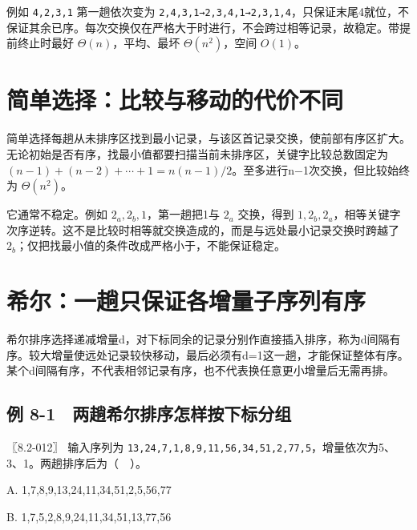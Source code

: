 例如 \texttt{4,}\allowbreak{}\texttt{2,}\allowbreak{}\texttt{3,}\allowbreak{}\texttt{1} 第一趟依次变为 \texttt{2,}\allowbreak{}\texttt{4,}\allowbreak{}\texttt{3,}\allowbreak{}\texttt{1→2,}\allowbreak{}\texttt{3,}\allowbreak{}\texttt{4,}\allowbreak{}\texttt{1→2,}\allowbreak{}\texttt{3,}\allowbreak{}\texttt{1,}\allowbreak{}\texttt{4}，只保证末尾4就位，不保证其余已序。每次交换仅在严格大于时进行，不会跨过相等记录，故稳定。带提前终止时最好 \(\Theta(n)\)，平均、最坏 \(\Theta(n^2)\)，空间 \(O(1)\)。

\section{简单选择：比较与移动的代价不同}\label{ds-08-04}

简单选择每趟从未排序区找到最小记录，与该区首记录交换，使前部有序区扩大。无论初始是否有序，找最小值都要扫描当前未排序区，关键字比较总数固定为 \((n-1)+(n-2)+\cdots+1=n(n-1)/2\)。至多进行n−1次交换，但比较始终为 \(\Theta(n^2)\)。

它通常不稳定。例如 \(2_a,2_b,1\)，第一趟把1与 \(2_a\) 交换，得到 \(1,2_b,2_a\)，相等关键字次序逆转。这不是比较时相等就交换造成的，而是与远处最小记录交换时跨越了 \(2_b\)；仅把找最小值的条件改成严格小于，不能保证稳定。

\section{希尔：一趟只保证各增量子序列有序}\label{ds-08-05}

希尔排序选择递减增量d，对下标同余的记录分别作直接插入排序，称为d间隔有序。较大增量使远处记录较快移动，最后必须有d=1这一趟，才能保证整体有序。某个d间隔有序，不代表相邻记录有序，也不代表换任意更小增量后无需再排。

\subsection{例 8-1　两趟希尔排序怎样按下标分组}\label{ds-ex8-1}

\noindent{}〖8.2-012〗 输入序列为 \texttt{13,}\allowbreak{}\texttt{24,}\allowbreak{}\texttt{7,}\allowbreak{}\texttt{1,}\allowbreak{}\texttt{8,}\allowbreak{}\texttt{9,}\allowbreak{}\texttt{11,}\allowbreak{}\texttt{56,}\allowbreak{}\texttt{34,}\allowbreak{}\texttt{51,}\allowbreak{}\texttt{2,}\allowbreak{}\texttt{77,}\allowbreak{}\texttt{5}，增量依次为5、3、1。两趟排序后为（　）。

A. 1,7,8,9,13,24,11,34,51,2,5,56,77

B. 1,7,5,2,8,9,24,11,34,51,13,77,56

